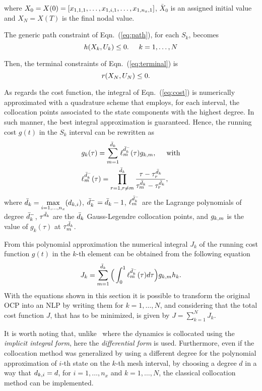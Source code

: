 where $X_0 = X(0) = [x_{1,1,1}, \dots, x_{1,i,1}, \dots, x_{1,n_{x},1}]$, $\bar{X}_{0}$ is an assigned initial value and $X_{N} = X(T)$ is the final nodal value.


The generic path constraint of Eqn.~(\ref{eq:path}), for each $S_k$, becomes
\begin{equation}\label{eq:nlpath}
h(X_k, U_k) \leq 0. \hspace{5mm} k = 1, \dots, N
\end{equation}

Then, the terminal constraints of Eqn.~(\ref{eq:terminal}) is
\begin{equation}\label{eq:npterminal}
	r(X_N, U_N) \leq 0. \hspace{5mm}
\end{equation}

As regards the cost function, the integral of Eqn.~(\ref{eq:cost}) is numerically approximated with a quadrature scheme that employs, for each interval, the collocation points associated to the state components with the highest degree. In such manner, the best integral approximation is guaranteed. Hence, the running cost $g(t)$ in the $S_k$ interval can be rewritten as
\begin{subequations}
	\begin{align}
	& g_k(\tau) = \sum_{m=1}^{\bar{d}_k} \ell_{m}^{\bar{d}_{k}^{-}}(\tau)g_{k,m}, \hspace{5mm} \text{with} \label{eq:nlpcost}\\
	&  \ell_{m}^{\bar{d}_{k}^{-}} (\tau) = \prod_{r=1, r\neq m}^{\bar{d}_k} \dfrac{\tau - \tau^{\bar{d}_{k}}_{r}}{\tau^{\bar{d}_{k}}_{m} - \tau^{\bar{d}_{k}}_{r}}, \label{eq:nlplm}
	\end{align}
\end{subequations}
where $\bar{d}_k = \max\limits_{i= 1, \dots, n_x}(d_{k,i})$, $\bar{d}_k^{-} = \bar{d}_k -1$, $\ell_{m}^{\bar{d}_{k}^{-}}$ are the Lagrange polynomials of degree $\bar{d}_k^{-}$, $\tau^{\bar{d}_{k}}$ are the $\bar{d}_k$ Gauss-Legendre collocation points, and $g_{k,m}$ is the value of $g_k (\tau)$ at $\tau^{\bar{d}_{k}}_{m}$.

From this polynomial approximation the numerical integral $J_k$ of the running cost function $g(t)$ in the $k$-th element can be obtained from the following equation
\begin{equation}\label{eq:nlpcostk}
	J_k = \sum_{m=1}^{\bar{d}_k}\Big(\int_{0}^{1}\ell_{m}^{\bar{d}_{k}^{-}}(\tau)d\tau\Big)g_{k,m} h_{k}.
\end{equation}
With the equations shown in this section it is possible to transform the original OCP into an NLP by writing them for $k = 1, \dots, N$, and considering that the total cost function $J$, that has to be minimized, is given by $J = \sum_{k=1}^{N}J_k$.

It is worth noting that, unlike~\cite{Patterson:OCAM:2015} where the dynamics is collocated using the \emph{implicit integral form}, here the \emph{differential form} is used.
Furthermore, even if the collocation method was generalized by using a different degree for the polynomial approximation of $i$-th state on the $k$-th mesh interval, by choosing a degree $d$ in a way that $d_{k,i} = d$, for $i = 1, \dots, n_x$ and $k = 1, \dots, N$, the classical collocation method can be implemented.
